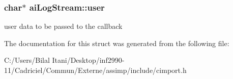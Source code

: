 \subsubsection[{\texorpdfstring{user}{user}}]{\setlength{\rightskip}{0pt plus 5cm}char$\ast$ ai\+Log\+Stream\+::user}\hypertarget{structai_log_stream_a3382042e4171a6dd5a71d7f98741f86e}{}\label{structai_log_stream_a3382042e4171a6dd5a71d7f98741f86e}
user data to be passed to the callback 

The documentation for this struct was generated from the following file\+:\begin{DoxyCompactItemize}
\item 
C\+:/\+Users/\+Bilal Itani/\+Desktop/inf2990-\/11/\+Cadriciel/\+Commun/\+Externe/assimp/include/cimport.\+h\end{DoxyCompactItemize}
